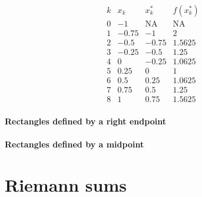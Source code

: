 \documentclass{ximera}
\begin{document}
\[
\begin{array}{c|c|c|c}
  k &  x_k  & x^*_k & f(x^*_k) \\ \hline
  0 & -1    & \text{NA} & \text{NA}  \\
  1 & -0.75 & -1    &   2      \\
  2 & -0.5  & -0.75 & 1.5625   \\
  3 & -0.25 & -0.5  & 1.25     \\
  4 &  0    & -0.25 & 1.0625   \\
  5 &  0.25 &  0    & 1        \\
  6 &  0.5  &  0.25 & 1.0625   \\
  7 &  0.75 &  0.5  & 1.25     \\
  8 &  1    &  0.75 & 1.5625   
\end{array}
\]

\paragraph{Rectangles defined by a right endpoint}


\paragraph{Rectangles defined by a midpoint}

\section{Riemann sums}
\end{document}
